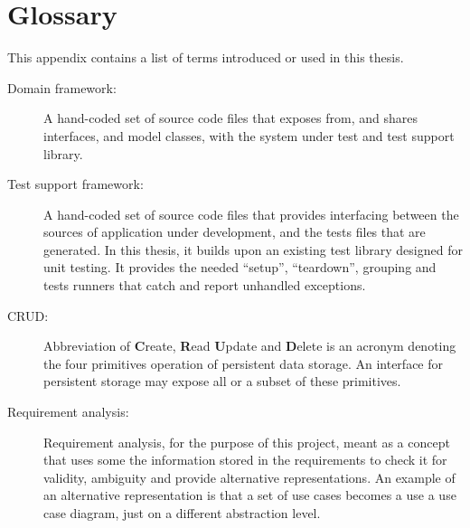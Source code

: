 \chapter{Glossary}
\label{appendix:glossary}
This appendix contains a list of terms introduced or used in this thesis.
\begin{description}
  \item[Domain framework:] A hand-coded set of source code files that exposes from, and shares interfaces, and model classes, with the system under test and test support library.
  \item[Test support framework:] A hand-coded set of source code files that provides interfacing between the sources of application under development, and the tests files that are generated. In this thesis, it builds upon an existing test library designed for unit testing. It provides the needed ``setup'', ``teardown'', grouping and tests runners that catch and report unhandled exceptions.
  \item[CRUD:] Abbreviation of \textbf{C}reate, \textbf{R}ead \textbf{U}pdate and \textbf{D}elete is an acronym denoting the four primitives operation of persistent data storage. An interface for persistent storage may expose all or a subset of these primitives.
  \item[Requirement analysis:] Requirement analysis, for the purpose of this project, meant as a concept that uses some the information stored in the requirements to check it for validity, ambiguity and provide alternative representations. An example of an alternative representation is that a set of use cases becomes a use a use case diagram, just on a different abstraction level.
\end{description}
